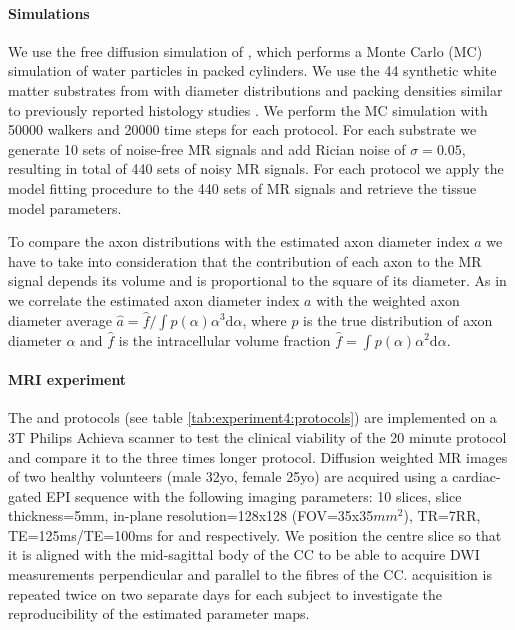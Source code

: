 \paragraph{Simulations}
We use the free diffusion simulation of \citet{Hall:2009}, which performs a Monte Carlo (MC) simulation of water particles in packed cylinders. We use the 44 synthetic white matter substrates from\citet{Alexander:2010} with diameter distributions and packing densities similar to previously reported histology studies \citep{Aboitiz:1992,Graf-von-Keyserlingk:1984,Lamantia:1990}.%
We perform the MC simulation with 50000 walkers and 20000 time steps for each protocol. For each substrate we generate 10 sets of noise-free MR signals and add Rician noise of $\sigma=0.05$, resulting in  total of 440 sets of noisy MR signals. For each protocol we apply the model fitting procedure to the 440 sets of MR signals and retrieve the tissue model parameters. 

To compare the axon distributions with the estimated axon diameter index $a$ we have to take into consideration that the contribution of each axon to the MR signal depends its volume and is proportional to the square of its diameter. As in \citet{Alexander:2010} we correlate the estimated axon diameter index $a$ with the weighted axon diameter average $\hat{a} = \hat{f} / \int p(\alpha)\alpha^3\mbox{d}\alpha$, where $p$ is the true distribution of axon diameter $\alpha$ and $\hat{f}$ is the intracellular volume fraction $\hat{f} = \int p(\alpha)\alpha^2\mbox{d}\alpha.$

\paragraph{MRI experiment}
The \SFshort{} and \OIlong{} protocols (see table \ref{tab:experiment4:protocols}) are implemented on a 3T Philips Achieva scanner to test the clinical viability of the 20 minute \SFshort{} protocol and compare it to the three times longer \OIlong{} protocol. Diffusion weighted MR images of two healthy volunteers (male 32yo, female 25yo) are acquired using a cardiac-gated EPI sequence with the following imaging parameters: 10 slices, slice thickness=5mm, in-plane resolution=128x128 (FOV=35x35$mm^2$), TR=7RR, TE=125ms/TE=100ms for \SFshort{} and \OIlong{} respectively. We position the centre slice so that it is aligned with the mid-sagittal body of the CC to be able to acquire DWI measurements perpendicular and parallel to the fibres of the CC. \SFshort{} acquisition is repeated twice on two separate days for each subject to investigate the reproducibility of the estimated parameter maps.
%
